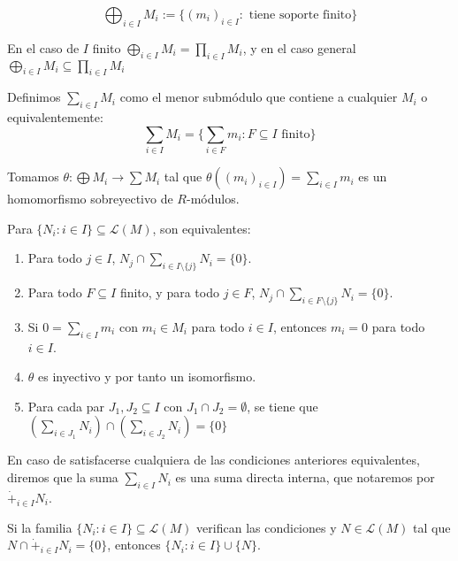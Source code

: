 \begin{df}
  \[
    \bigoplus_{i\in I} M_i:=\{{(m_i)}_{i\in I}: \textrm{ tiene soporte
    finito}\}
  \]
\end{df}


En el caso de \(I\) finito \(\bigoplus_{i\in I} M_i=\prod_{i\in I} M_i\),
y en el caso general \(\bigoplus_{i\in I} M_i\subseteq\prod_{i\in I} M_i\)

\begin{df}
  Definimos \(\sum_{i\in I} M_i\) como el menor submódulo que contiene
  a cualquier \(M_i\) o equivalentemente:
  \[
    \sum_{i\in I} M_i=\{\sum_{i\in F} m_i: F\subseteq I \textrm{ finito}\}
  \]
\end{df}

\begin{prop}
  Tomamos \(\theta:\bigoplus M_i\longrightarrow \sum M_i\) tal que
  \(\theta({(m_i)}_{i\in I})=\sum_{i\in I} m_i\) es un homomorfismo
  sobreyectivo de \(R\)-módulos.

  Para \(\{N_i:i\in I\}\subseteq\mathcal{L}(M)\), son equivalentes:
  \begin{enumerate}
    \item Para todo \(j\in I\), \(N_j\cap\sum_{i\in I\setminus\{j\}} N_i
      =\{0\}\).
    \item Para todo \(F\subseteq I\) finito, y para todo \(j\in F\),
      \(N_j\cap\sum_{i\in F\setminus\{j\}} N_i
      =\{0\}\).
    \item Si \(0=\sum_{i\in I} m_i\) con \(m_i\in M_i\) para todo
      \(i\in I\), entonces \(m_i=0\) para todo \(i\in I\).
    \item \(\theta\) es inyectivo y por tanto un isomorfismo.
    \item Para cada par \(J_1,J_2\subseteq I\) con
      \(J_1\cap J_2=\emptyset\), se tiene que
      \(\left(\sum_{i\in J_1} N_i\right)\cap
      \left(\sum_{i\in J_2} N_i\right)=\{0\}\)
  \end{enumerate}
\end{prop}

\begin{df}
  En caso de satisfacerse cualquiera de las condiciones anteriores
  equivalentes, diremos que la suma \(\sum_{i\in I} N_i\) es una suma
  directa interna, que notaremos por \(\dot{+}_{i\in I} N_i\).
\end{df}

\begin{cor}
  Si la familia \(\{N_i:i\in I\}\subseteq\mathcal{L}(M)\) verifican
  las condiciones y \(N\in\mathcal{L}(M)\) tal que
  \(N\cap\dot{+}_{i\in I} N_i=\{0\}\), entonces \(\{N_i:i\in I\}\cup\{N\}\).
\end{cor}

